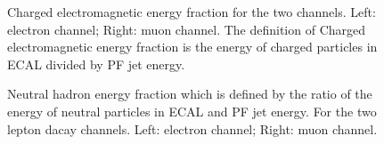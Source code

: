 \documentclass[12pt]{article} %
\begin{document}
\begin{figure}[H] %
  \caption{Charged electromagnetic energy fraction for the two channels. Left: electron channel; Right: muon channel. The definition of Charged electromagnetic energy fraction is the energy of charged particles in ECAL divided by PF jet energy.}
  \label{fig:CEmEF}
\end{figure}

\begin{figure}[H] %
  \caption{Neutral hadron energy fraction which is defined by the ratio of the energy of neutral particles in ECAL and PF jet energy. For the two lepton dacay channels. Left: electron channel; Right: muon channel.}
  \label{fig:NHadEF}
\end{figure}
\end{document}
